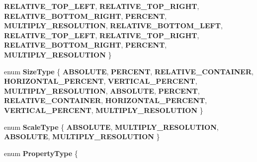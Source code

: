 \begin{DoxyCompactItemize}
{\bfseries R\+E\+L\+A\+T\+I\+V\+E\+\_\+\+T\+O\+P\+\_\+\+L\+E\+FT}, 
{\bfseries R\+E\+L\+A\+T\+I\+V\+E\+\_\+\+T\+O\+P\+\_\+\+R\+I\+G\+HT}, 
{\bfseries R\+E\+L\+A\+T\+I\+V\+E\+\_\+\+B\+O\+T\+T\+O\+M\+\_\+\+R\+I\+G\+HT}, 
\newline
{\bfseries P\+E\+R\+C\+E\+NT}, 
{\bfseries M\+U\+L\+T\+I\+P\+L\+Y\+\_\+\+R\+E\+S\+O\+L\+U\+T\+I\+ON}, 
{\bfseries R\+E\+L\+A\+T\+I\+V\+E\+\_\+\+B\+O\+T\+T\+O\+M\+\_\+\+L\+E\+FT}, 
{\bfseries R\+E\+L\+A\+T\+I\+V\+E\+\_\+\+T\+O\+P\+\_\+\+L\+E\+FT}, 
\newline
{\bfseries R\+E\+L\+A\+T\+I\+V\+E\+\_\+\+T\+O\+P\+\_\+\+R\+I\+G\+HT}, 
{\bfseries R\+E\+L\+A\+T\+I\+V\+E\+\_\+\+B\+O\+T\+T\+O\+M\+\_\+\+R\+I\+G\+HT}, 
{\bfseries P\+E\+R\+C\+E\+NT}, 
{\bfseries M\+U\+L\+T\+I\+P\+L\+Y\+\_\+\+R\+E\+S\+O\+L\+U\+T\+I\+ON}
 \}
\item 
\mbox{\label{classcocosbuilder_1_1CCBReader_a4e1876d76c39cbbea7cfa0bb458ea134}} 
enum {\bfseries Size\+Type} \{ \newline
{\bfseries A\+B\+S\+O\+L\+U\+TE}, 
{\bfseries P\+E\+R\+C\+E\+NT}, 
{\bfseries R\+E\+L\+A\+T\+I\+V\+E\+\_\+\+C\+O\+N\+T\+A\+I\+N\+ER}, 
{\bfseries H\+O\+R\+I\+Z\+O\+N\+T\+A\+L\+\_\+\+P\+E\+R\+C\+E\+NT}, 
\newline
{\bfseries V\+E\+R\+T\+I\+C\+A\+L\+\_\+\+P\+E\+R\+C\+E\+NT}, 
{\bfseries M\+U\+L\+T\+I\+P\+L\+Y\+\_\+\+R\+E\+S\+O\+L\+U\+T\+I\+ON}, 
{\bfseries A\+B\+S\+O\+L\+U\+TE}, 
{\bfseries P\+E\+R\+C\+E\+NT}, 
\newline
{\bfseries R\+E\+L\+A\+T\+I\+V\+E\+\_\+\+C\+O\+N\+T\+A\+I\+N\+ER}, 
{\bfseries H\+O\+R\+I\+Z\+O\+N\+T\+A\+L\+\_\+\+P\+E\+R\+C\+E\+NT}, 
{\bfseries V\+E\+R\+T\+I\+C\+A\+L\+\_\+\+P\+E\+R\+C\+E\+NT}, 
{\bfseries M\+U\+L\+T\+I\+P\+L\+Y\+\_\+\+R\+E\+S\+O\+L\+U\+T\+I\+ON}
 \}
\item 
\mbox{\label{classcocosbuilder_1_1CCBReader_ae42241bc73eb3fab6b9b9767f68e6c68}} 
enum {\bfseries Scale\+Type} \{ {\bfseries A\+B\+S\+O\+L\+U\+TE}, 
{\bfseries M\+U\+L\+T\+I\+P\+L\+Y\+\_\+\+R\+E\+S\+O\+L\+U\+T\+I\+ON}, 
{\bfseries A\+B\+S\+O\+L\+U\+TE}, 
{\bfseries M\+U\+L\+T\+I\+P\+L\+Y\+\_\+\+R\+E\+S\+O\+L\+U\+T\+I\+ON}
 \}
\item 
\mbox{\label{classcocosbuilder_1_1CCBReader_af7c226328c6eb5932c3555efaf282eb9}} 
enum {\bfseries Property\+Type} \{ \newline

\end{DoxyCompactItemize}
